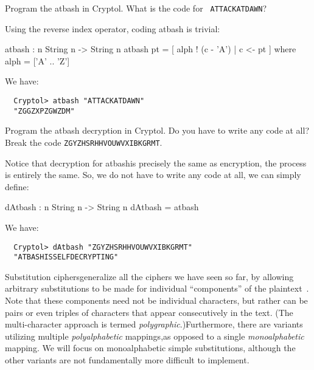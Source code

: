 \begin{Exercise}\label{ex:atbash:0}
  Program the atbash in Cryptol. What is the code for {\tt
    ATTACKATDAWN}?
\end{Exercise}
\begin{Answer}
  Using the reverse index operator, coding atbash is
  trivial:\indRIndex\indAtbash
\begin{code}
  atbash : {n} String n -> String n
  atbash pt = [ alph ! (c - 'A') | c <- pt ]
      where alph = ['A' .. 'Z']
\end{code}
We have:
\begin{Verbatim}
  Cryptol> atbash "ATTACKATDAWN"
  "ZGGZXPZGWZDM"
\end{Verbatim}
\end{Answer}

\begin{Exercise}\label{ex:atbash:1}
  Program the atbash decryption in Cryptol. Do you have to write any
  code at all? Break the code {\tt ZGYZHSRHHVOUWVXIBKGRMT}.
\end{Exercise}
\begin{Answer}
  Notice that decryption for atbash\indAtbash is precisely the same as
  encryption, the process is entirely the same. So, we do not have to
  write any code at all, we can simply define:
\begin{code}
  dAtbash : {n} String n -> String n
  dAtbash = atbash
\end{code}
We have:
\begin{Verbatim}
  Cryptol> dAtbash "ZGYZHSRHHVOUWVXIBKGRMT"
  "ATBASHISSELFDECRYPTING"
\end{Verbatim}
\end{Answer}


Substitution ciphers\indSubstitutioncipher generalize all the ciphers
we have seen so far, by allowing arbitrary substitutions to be made
for individual ``components'' of the
plaintext~\cite{wiki:substitution}.  Note that these components need
not be individual characters, but rather can be pairs or even triples
of characters that appear consecutively in the text. (The
multi-character approach is termed {\em
  polygraphic}.)\indPolyGraphSubst Furthermore, there are variants
utilizing multiple {\em polyalphabetic} mappings,\indPolyAlphSubst as
opposed to a single {\em monoalphabetic} mapping\indMonoAlphSubst.  We
will focus on monoalphabetic simple substitutions, although the other
variants are not fundamentally more difficult to implement.

